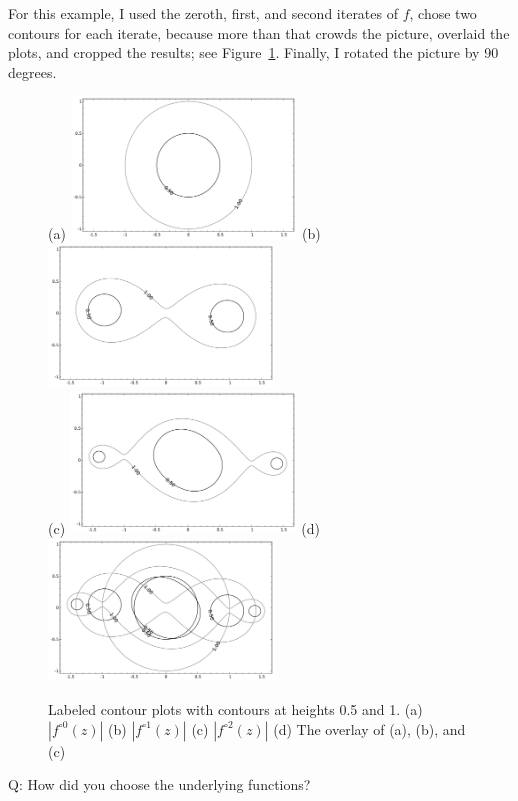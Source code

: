 \documentclass[12pt, a4paper]{amsart}
\begin{document}
For this example, I used the zeroth, first, and second iterates of $f$, chose two contours for each iterate, because more than that crowds the picture, overlaid the plots, and cropped the results; see Figure~\ref{fig:iterates}.
Finally, I rotated the picture by 90 degrees.

\begin{figure}[!htb]
(a) \includegraphics[width=60mm]{tutorial_c0.pdf}\qquad
(b) \includegraphics[width=60mm]{tutorial_c1.pdf}\\
(c) \includegraphics[width=60mm]{tutorial_c2.pdf}\qquad
(d) \includegraphics[width=60mm]{tutorial_c012.pdf}
\caption{
Labeled contour plots with contours at heights 0.5 and 1.
(a) $|f^{\circ 0}(z)|$ 
(b) $|f^{\circ 1}(z)|$
(c) $|f^{\circ 2}(z)|$
(d) The overlay of (a), (b), and (c)
}
\label{fig:iterates}
\end{figure}

Q: How did you choose the underlying functions?
\end{document}
